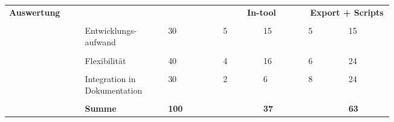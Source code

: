 \documentclass[main.tex]{subfiles} %
\begin{document}
\begin{table}[ht]
\begin{tabular}{|p{0.14\linewidth}|p{0.15\linewidth}|p{0.115\linewidth}|p{0.08\linewidth}|p{0.09\linewidth}|p{0.08\linewidth}|p{0.09\linewidth}|}
        \multirow{5}{4em}{\textbf{Auswertung}}             & \multicolumn{2}{c|}{}               & \multicolumn{2}{c|}{\textbf{In-tool}}        & \multicolumn{2}{c|}{\textbf{Export + Scripts}}                                          \\[1pt]
        \cline{2-7}
                                                           &                                     &                                              &                                                &             &            &             \\[-9pt]
                                                           & Entwicklungs-aufwand                & 30                                           & 5                                              & 15          & 5          & 15          \\[1pt]
        \cline{2-7}
                                                           &                                     &                                              &                                                &             &            &             \\[-9pt]
                                                           & Flexibilität                        & 40                                           & 4                                              & 16          & 6          & 24          \\[1pt]
        \cline{2-7}
                                                           &                                     &                                              &                                                &             &            &             \\[-9pt]
                                                           & Integration in Dokumentation        & 30                                           & 2                                              & 6           & 8          & 24          \\[1pt]
        \cline{2-7}
                                                           &                                     &                                              &                                                &             &            &             \\[-9pt]
                                                           & \textbf{Summe}                      & \textbf{100}                                 &                                                & \textbf{37} &            & \textbf{63} \\[1pt]

\end{tabular}
\end{table}
\end{document}
